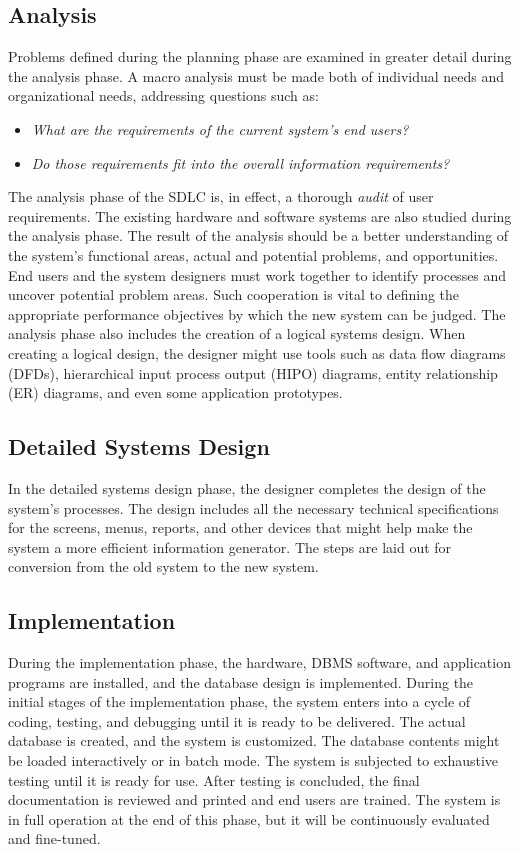 \documentclass[a4paper, 12pt, titlepage]{report}
\begin{document}
\subsection{Analysis}
Problems defined during the planning phase are examined in greater detail during the analysis phase. A macro analysis must be made both of individual needs and organizational needs, addressing questions such as:
\begin{itemize}
\item \emph{What are the requirements of the current system’s end users?}
\item \emph{Do those requirements fit into the overall information requirements?}
\end{itemize}
The analysis phase of the SDLC is, in effect, a thorough \emph{audit} of user requirements. The existing hardware and software systems are also studied during the analysis phase. The result of the analysis should be a better understanding of the system’s functional areas, actual and potential problems, and opportunities. End users and the system designers must work together to identify processes and uncover potential problem areas. Such cooperation is vital to defining the appropriate performance objectives by which the new system can be judged. The analysis phase also includes the creation of a logical systems design. When creating a logical design, the designer might use tools such as data flow diagrams (DFDs), hierarchical input process output (HIPO) diagrams, entity relationship (ER) diagrams, and even some application prototypes.
\subsection{Detailed Systems Design}
In the detailed systems design phase, the designer completes the design of the system’s processes. The design includes all the necessary technical specifications for the screens, menus, reports, and other devices that might help make the system a more efficient information generator. The steps are laid out for conversion from the old system to the new system.
\subsection{Implementation}
During the implementation phase, the hardware, DBMS software, and application programs are installed, and the database design is implemented. During the initial stages of the implementation phase, the system enters into a cycle of coding, testing, and debugging until it is ready to be delivered. The actual database is created, and the system is customized. The database contents might be loaded interactively or in batch mode. The system is subjected to exhaustive testing until it is ready for use. After testing is concluded, the final documentation is reviewed and printed and end users are trained. The system is in full operation at the end of this phase, but it will be continuously evaluated and fine-tuned.
\end{document}
